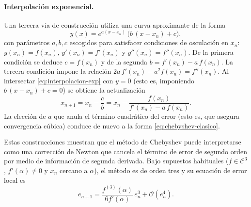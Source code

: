 \paragraph{Interpolaci\'on exponencial.}
Una tercera v\'ia de construcci\'on utiliza una curva aproximante de la forma
\begin{equation}
\label{eq:interpolacion-exp}
 y(x) = e^{a(x-x_n)}\,\bigl(b\,(x-x_n)+c\bigr),
\end{equation}
con par\'ametros $a,b,c$ escogidos para satisfacer condiciones de osculaci\'on en $x_n$:
$y(x_n)=f(x_n)$, $y'(x_n)=f'(x_n)$ y $y''(x_n)=f''(x_n)$. De la primera condici\'on
se deduce $c=f(x_n)$ y de la segunda $b=f'(x_n)-a\,f(x_n)$. La tercera condici\'on
impone la relaci\'on $2a\,f'(x_n)-a^2 f(x_n)=f''(x_n)$. Al intersectar \eqref{eq:interpolacion-exp}
con $y=0$ (esto es, imponiendo $b\,(x-x_n)+c=0$) se obtiene la actualizaci\'on
\[
 x_{n+1}=x_n-\frac{c}{b}=x_n-\frac{f(x_n)}{f'(x_n)-a\,f(x_n)}.
\]
La elecci\'on de $a$ que anula el t\'ermino cuadr\'atico del error (esto es, que asegura
convergencia c\'ubica) conduce de nuevo a la forma \eqref{eq:chebyshev-clasico}.

\medskip
Estas construcciones muestran que el m\'etodo de Chebyshev puede interpretarse
como una correcci\'on de Newton que cancela el t\'ermino de error de segundo orden
por medio de informaci\'on de segunda derivada. Bajo supuestos habituales
($f\in\mathcal{C}^3$, $f'(\alpha)\neq0$ y $x_n$ cercano a $\alpha$), el m\'etodo es de
orden tres y su ecuaci\'on de error local es
\[
 e_{n+1}=\frac{f^{(3)}(\alpha)}{6f'(\alpha)}\,e_n^3+\mathcal{O}(e_n^4).
\]


